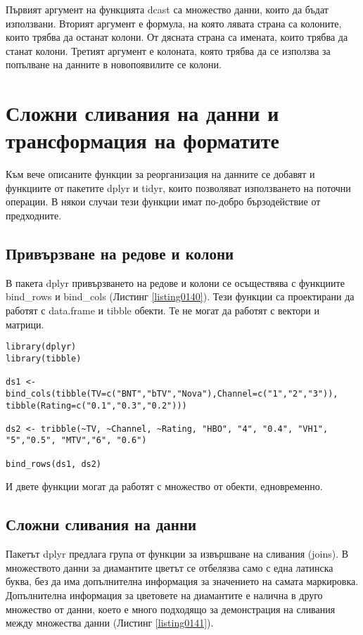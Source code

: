 Първият аргумент на функцията dcast са множество данни, които да бъдат използвани. Вторият аргумент е формула, на която лявата страна са колоните, които трябва да останат колони. От дясната страна са имената, които трябва да станат колони. Третият аргумент е колоната, която трябва да се използва за попълване на данните в новопоявилите се колони.

\section{Сложни сливания на данни и трансформация на форматите}

Към вече описаните функции за реорганизация на данните се добавят и функциите от пакетите dplyr и tidyr, които позволяват използването на поточни операции. В някои случаи тези функции имат по-добро бързодействие от предходните.

\subsection{Привързване на редове и колони}

В пакета dplyr привързването на редове и колони се осъществява с функциите bind\_rows и bind\_cols (Листинг \ref{listing0140}). Тези функции са проектирани да работят с data.frame и tibble обекти. Те не могат да работят с вектори и матрици.

\begin{lstlisting}[caption=Обединяване по колони и редове, label=listing0140]
library(dplyr)
library(tibble)

ds1 <- bind_cols(tibble(TV=c("BNT","bTV","Nova"),Channel=c("1","2","3")), tibble(Rating=c("0.1","0.3","0.2")))

ds2 <- tribble(~TV, ~Channel, ~Rating, "HBO", "4", "0.4", "VH1", "5","0.5", "MTV","6", "0.6")

bind_rows(ds1, ds2)
\end{lstlisting}

И двете функции могат да работят с множество от обекти, едновременно.

\subsection{Сложни сливания на данни}

Пакетът dplyr предлага група от функции за извършване на сливания (joins). В множеството данни за диамантите цветът се отбелязва само с една латинска буква, без да има допълнителна информация за значението на самата маркировка. Допълнителна информация за цветовете на диамантите е налична в друго множество от данни, което е много подходящо за демонстрация на сливания между множества данни (Листинг \ref{listing0141}).

